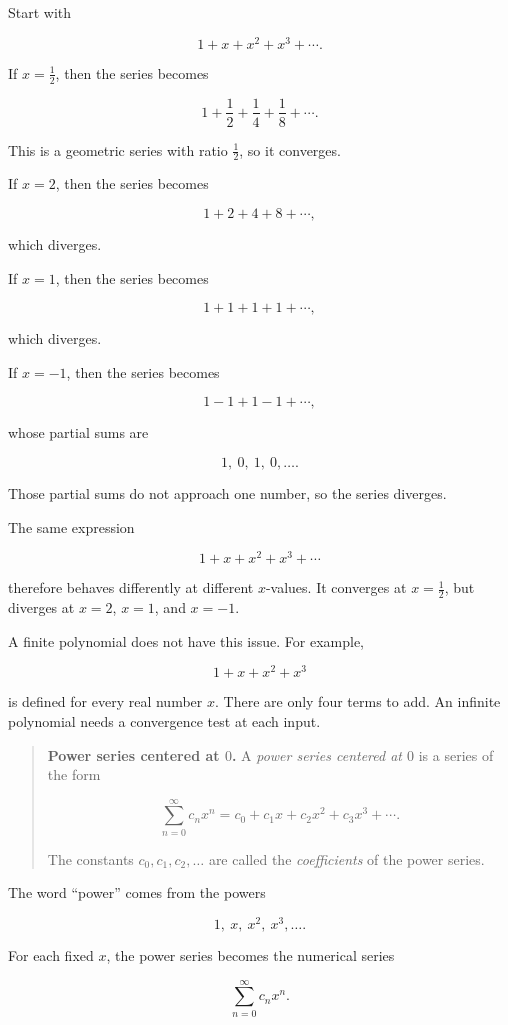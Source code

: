 Start with

\[
1+x+x^2+x^3+\cdots.
\]

If \(x=\frac12\), then the series becomes

\[
1+\frac12+\frac14+\frac18+\cdots.
\]

This is a geometric series with ratio \(\frac12\), so it converges.

If \(x=2\), then the series becomes

\[
1+2+4+8+\cdots,
\]

which diverges.

If \(x=1\), then the series becomes

\[
1+1+1+1+\cdots,
\]

which diverges.

If \(x=-1\), then the series becomes

\[
1-1+1-1+\cdots,
\]

whose partial sums are

\[
1,\ 0,\ 1,\ 0,\ldots.
\]

Those partial sums do not approach one number, so the series diverges.

The same expression

\[
1+x+x^2+x^3+\cdots
\]

therefore behaves differently at different \(x\)-values.  It converges at
\(x=\frac12\), but diverges at \(x=2\), \(x=1\), and \(x=-1\).

A finite polynomial does not have this issue.  For example,

\[
1+x+x^2+x^3
\]

is defined for every real number \(x\).  There are only four terms to add.  An infinite
polynomial needs a convergence test at each input.

\begin{quote}
\textbf{Power series centered at \(0\).}
A \emph{power series centered at \(0\)} is a series of the form

\[
\boxed{
\sum_{n=0}^{\infty} c_n x^n
=
c_0+c_1x+c_2x^2+c_3x^3+\cdots.
}
\]

The constants \(c_0,c_1,c_2,\ldots\) are called the \emph{coefficients} of the power
series.
\end{quote}

The word ``power'' comes from the powers

\[
1,\ x,\ x^2,\ x^3,\ldots.
\]

For each fixed \(x\), the power series becomes the numerical series

\[
\sum_{n=0}^{\infty} c_n x^n.
\]

